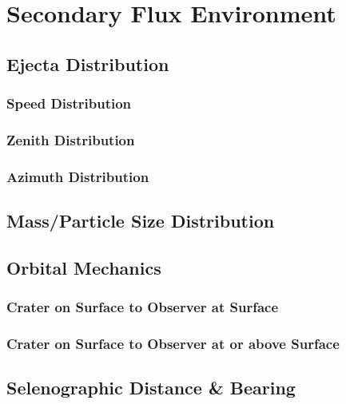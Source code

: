 \documentclass{article}
\begin{document}
\section{Secondary Flux Environment}





\subsection{Ejecta Distribution}


\subsubsection{Speed Distribution}



\subsubsection{Zenith Distribution}


\subsubsection{Azimuth Distribution}


\subsection{Mass/Particle Size Distribution}


\subsection{Orbital Mechanics}

\subsubsection{Crater on Surface to Observer at Surface}

\subsubsection{Crater on Surface to Observer at or above Surface}

\subsection{Selenographic Distance \& Bearing}
\end{document}
